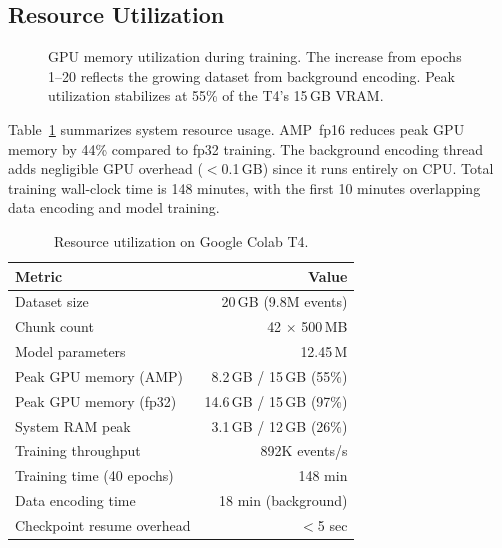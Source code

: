 \documentclass[letterpaper,twocolumn,10pt]{article}
\begin{document}
\subsection{Resource Utilization}

\begin{figure}[t]
\centering
{}
\caption{GPU memory utilization during training. The increase from
epochs 1--20 reflects the growing dataset from background encoding.
Peak utilization stabilizes at 55\% of the T4's 15\,GB VRAM.}
\label{fig:gpu}
\end{figure}

Table~\ref{tab:resources} summarizes system resource usage.
AMP~fp16 reduces peak GPU memory by 44\% compared to fp32
training. The background encoding thread adds negligible GPU
overhead ($<$0.1\,GB) since it runs entirely on CPU. Total
training wall-clock time is 148 minutes, with the first 10
minutes overlapping data encoding and model training.

\begin{table}[t]
\centering
\caption{Resource utilization on Google Colab T4.}
\label{tab:resources}
\small
\begin{tabular}{@{}lr@{}}
\toprule
\textbf{Metric} & \textbf{Value} \\
\midrule
Dataset size & 20\,GB (9.8M events) \\
Chunk count & 42 $\times$ 500\,MB \\
Model parameters & 12.45\,M \\
Peak GPU memory (AMP) & 8.2\,GB / 15\,GB (55\%) \\
Peak GPU memory (fp32) & 14.6\,GB / 15\,GB (97\%) \\
System RAM peak & 3.1\,GB / 12\,GB (26\%) \\
Training throughput & 892K events/s \\
Training time (40 epochs) & 148 min \\
Data encoding time & 18 min (background) \\
Checkpoint resume overhead & $<$5 sec \\
\bottomrule
\end{tabular}
\end{table}
\end{document}
